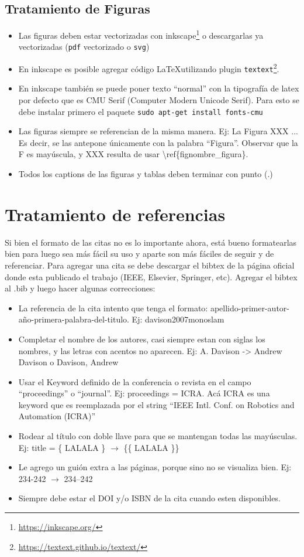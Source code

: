 \documentclass[a4paper,	11pt]{article}
\begin{document}
\subsection{Tratamiento de Figuras}
%
\begin{itemize}
    \item Las figuras deben estar vectorizadas con inkscape\footnote{\url{https://inkscape.org/}} o descargarlas ya vectorizadas (\lstinline{pdf} vectorizado o \lstinline{svg})
    \item En inkscape es posible agregar código \LaTeX utilizando plugin \lstinline{textext}\footnote{\url{https://textext.github.io/textext/}}.
    \item En inkscape también se puede poner texto ``normal'' con la tipografía de latex por defecto que es CMU Serif  (Computer Modern Unicode Serif). Para esto se debe instalar primero el paquete \lstinline{sudo apt-get install fonts-cmu}
    \item Las figuras siempre se referencian de la misma manera. Ej: La Figura XXX ... Es decir, se las antepone únicamente con la palabra ``Figura''. Observar que la F es mayúscula, y XXX resulta de usar \textbackslash ref\{fig\:nombre\_figura\}.
    \item Todos los captions de las figuras y tablas deben terminar con punto (.)
\end{itemize}


\section{Tratamiento de referencias}
Si bien el formato de las citas no es lo importante ahora, está bueno formatearlas bien para luego sea más fácil su uso y aparte son más fáciles de seguir y de referenciar. Para agregar una cita se debe descargar el bibtex de la página oficial donde esta publicado el trabajo (IEEE, Elsevier, Springer, etc). Agregar el bibtex al .bib y luego hacer algunas correcciones:
\begin{itemize}
    \item La referencia de la cita intento que tenga el formato: apellido-primer-autor-año-primera-palabra-del-titulo. Ej: davison2007monoslam
    \item Completar el nombre de los autores, casi siempre estan con siglas los nombres, y las letras con acentos no aparecen. Ej: A. Davison -> Andrew Davison o Davison, Andrew
    \item Usar el Keyword definido de la conferencia o revista en el campo ``proceedings'' o ``journal''. Ej: proceedings = ICRA. Acá ICRA es una keyword que es reemplazada por el string ``IEEE Intl. Conf. on Robotics and Automation (ICRA)''
    \item Rodear al título con doble llave para que se mantengan todas las mayúsculas. Ej: title = \{ LALALA \} $\rightarrow$ \{\{ LALALA \}\}
    \item Le agrego un guión extra a las páginas, porque sino no se visualiza bien. Ej: 234-242 $\rightarrow$ 234--242
    \item Siempre debe estar el DOI y/o ISBN de la cita cuando esten disponibles.
\end{itemize}
\end{document}
